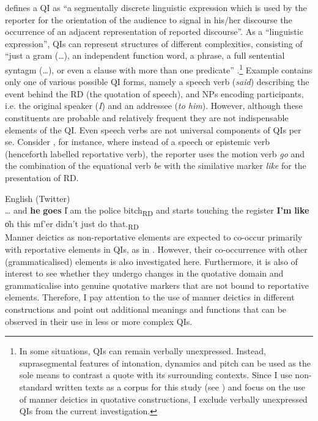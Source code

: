 \documentclass[output=paper,colorlinks,citecolor=brown]{langscibook}
\begin{document}
\citet[11]{Güldemann2008} defines a QI as “a segmentally discrete linguistic expression which is used by the reporter for the orientation of the audience to signal in his/her discourse the occurrence of an adjacent representation of reported discourse”. As a “linguistic expression”, QIs can represent structures of different complexities, consisting of “just a gram (…), an independent function word, a phrase, a full sentential syntagm (…), or even a clause with more than one predicate” \citep[11]{Güldemann2008}.\footnote{In some situations, QIs can remain verbally unexpressed. Instead, suprasegmental features of intonation, dynamics and pitch can be used as the sole means to contrast a quote with its surrounding contexts. Since I use non-standard written texts as a corpus for this study (see ) and focus on the use of manner deictics in quotative constructions, I exclude verbally unexpressed QIs from the current investigation.} Example  contains only one of various possible QI forms, namely a speech verb (\textit{said}) describing the event behind the RD (the quotation of speech), and NPs encoding participants, i.e. the original speaker (\textit{I}) and an addressee (\textit{to him}). However, although these constituents are probable and relatively frequent they are not indispensable elements of the QI. Even speech verbs are not universal components of QIs per se. Consider , for instance, where instead of a speech or epistemic verb (henceforth labelled reportative verb), the reporter uses the motion verb \textit{go} and the combination of the equational verb \textit{be} with the similative marker \textit{like} for the presentation of RD.

\ea\label{ex:teptiuk:3}
{English (Twitter)}\\
… and \textbf{he} \textbf{goes} \|I am the police bitch\|\textsubscript{RD} and starts touching the register \textbf{I’m} \textbf{like} \|oh this mf’er didn’t just do that.\|\textsubscript{RD}\\
\z
Manner deictics as non-reportative elements are expected to co-occur primarily with reportative elements in QIs, as in . However, their co-occurrence with other (grammaticalised) elements is also investigated here. Furthermore, it is also of interest to see whether they undergo changes in the quotative domain and grammaticalise into genuine quotative markers that are not bound to reportative elements. Therefore, I pay attention to the use of manner deictics in different constructions and point out additional meanings and functions that can be observed in their use in less or more complex QIs.
\end{document}
